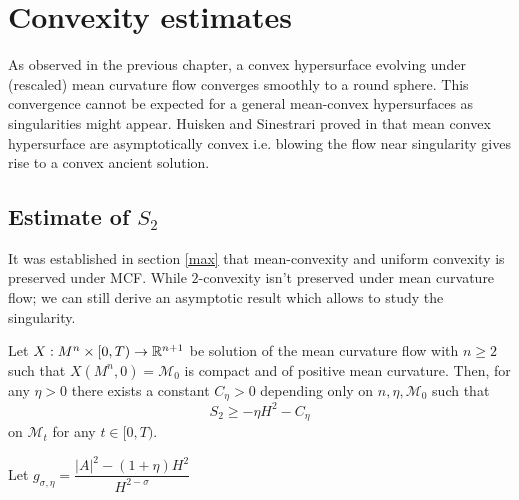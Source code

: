 \chapter{Convexity estimates}

As observed in the previous chapter, a convex hypersurface evolving under (rescaled) mean curvature flow converges smoothly to a round sphere. This convergence cannot be expected for a general mean-convex hypersurfaces as singularities might appear. Huisken and Sinestrari proved in \cite{huisken1999convexity, huisken1999mean} that mean convex hypersurface are asymptotically convex i.e. blowing the flow near singularity gives rise to a convex ancient solution.

\section{Estimate of $S_{2}$}
It was established in section \cref{max} that mean-convexity and uniform convexity is preserved under MCF. While $ 2 $-convexity isn't preserved under mean curvature flow; we can still derive an asymptotic result which allows to study the singularity. %
\begin{thm}\label{mainthm}
    Let $ X : M^{n} \times [0,T) \to \mathbb{R}^{n+1}$ be solution of the mean curvature flow with $ n \ge 2 $ such that $ X(M^{n}, 0) = \mathcal{M}_{0} $ is compact and of positive mean curvature. Then, for any $ \eta >0 $ there exists a constant $ C_{\eta} >0 $ depending only on $ n, \eta, \mathcal{M}_{0} $ such that 
    \begin{equation}
        S_{2} \ge - \eta H^{2} - C_{\eta}
    \end{equation}
    on $ \mathcal{M}_{t} $ for any $ t \in [0,T) $.
\end{thm}
Let $ g_{\sigma,\eta} = \dfrac{|A|^{2}-(1+\eta)H^{2}}{H^{2-\sigma}} $


\begin{comment}
\begin{lemma}
    \begin{equation}
        | H \cdot\nabla_{i} h_{kl}  - \nabla_{i}H\cdot h_{kl}|^{2} = H^{2}| \nabla A|^{2}+ |A|^{2}| \nabla H|^{2}   - \left<  \nabla_{i}|A|^{2}, \nabla_{i}H \right>H
    \end{equation}
\end{lemma}
\begin{proof}
    \begin{align*}
        \left< H \cdot\nabla_{i} h_{kl}  - \nabla_{i}H\cdot h_{kl}, H \cdot\nabla_{i} h_{kl}  - \nabla_{i}H\cdot h_{kl} \right> & = H^{2}| \nabla A|^{2} + 
    \end{align*}
\end{proof} 
\end{comment}

